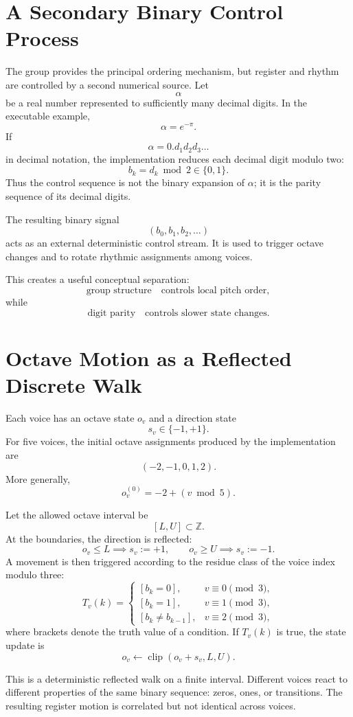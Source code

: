 \documentclass[11pt,a4paper]{article}
\newcommand{\Z}{\mathbb{Z}}
\begin{document}
\section{A Secondary Binary Control Process}

The group provides the principal ordering mechanism, but register and rhythm are controlled by a second numerical source. Let
\[
\alpha
\]
be a real number represented to sufficiently many decimal digits. In the executable example,
\[
\alpha=e^{-\pi}.
\]
If
\[
\alpha=0.d_1d_2d_3\ldots
\]
in decimal notation, the implementation reduces each decimal digit modulo two:
\[
b_k=d_k\bmod 2\in\{0,1\}.
\]
Thus the control sequence is not the binary expansion of $\alpha$; it is the parity sequence of its decimal digits.

The resulting binary signal
\[
(b_0,b_1,b_2,\ldots)
\]
acts as an external deterministic control stream. It is used to trigger octave changes and to rotate rhythmic assignments among voices.

This creates a useful conceptual separation:
\[
\text{group structure} \quad \text{controls local pitch order},
\]
while
\[
\text{digit parity} \quad \text{controls slower state changes}.
\]

\section{Octave Motion as a Reflected Discrete Walk}

Each voice has an octave state $o_v$ and a direction state
\[
s_v\in\{-1,+1\}.
\]
For five voices, the initial octave assignments produced by the implementation are
\[
(-2,-1,0,1,2).
\]
More generally,
\[
o_v^{(0)}=-2+(v\bmod 5).
\]

Let the allowed octave interval be
\[
[L,U]\subset\Z.
\]
At the boundaries, the direction is reflected:
\[
o_v\le L \implies s_v:=+1,
\qquad
o_v\ge U \implies s_v:=-1.
\]
A movement is then triggered according to the residue class of the voice index modulo three:
\[
T_v(k)=
\begin{cases}
[b_k=0], & v\equiv 0\pmod 3,\\
[b_k=1], & v\equiv 1\pmod 3,\\
[b_k\neq b_{k-1}], & v\equiv 2\pmod 3,
\end{cases}
\]
where brackets denote the truth value of a condition. If $T_v(k)$ is true, the state update is
\[
o_v\leftarrow \operatorname{clip}(o_v+s_v,L,U).
\]

This is a deterministic reflected walk on a finite interval. Different voices react to different properties of the same binary sequence: zeros, ones, or transitions. The resulting register motion is correlated but not identical across voices.
\end{document}
